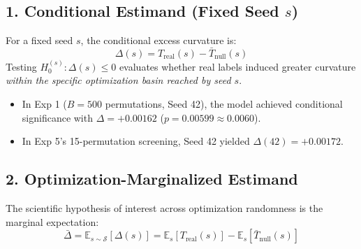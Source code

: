 \documentclass{article}
\begin{document}
\subsection*{1. Conditional Estimand (Fixed Seed $s$)}
For a fixed seed $s$, the conditional excess curvature is:
\begin{equation}
\Delta(s) = T_{\mathrm{real}}(s) - \bar{T}_{\mathrm{null}}(s)
\end{equation}
Testing $H_0^{(s)}: \Delta(s) \le 0$ evaluates whether real labels induced greater curvature \textit{within the specific optimization basin reached by seed $s$}.
\begin{itemize}
    \item In Exp 1 ($B=500$ permutations, Seed 42), the model achieved conditional significance with $\Delta = +0.00162$ ($p = 0.00599 \approx 0.0060$).
    \item In Exp 5's 15-permutation screening, Seed 42 yielded $\Delta(42) = +0.00172$.
\end{itemize}

\subsection*{2. Optimization-Marginalized Estimand}
The scientific hypothesis of interest across optimization randomness is the marginal expectation:
\begin{equation}
\bar{\Delta} = \mathbb{E}_{s \sim \mathcal{S}} [\Delta(s)] = \mathbb{E}_s [T_{\mathrm{real}}(s)] - \mathbb{E}_{s} [\bar{T}_{\mathrm{null}}(s)]
\end{equation}
\end{document}
